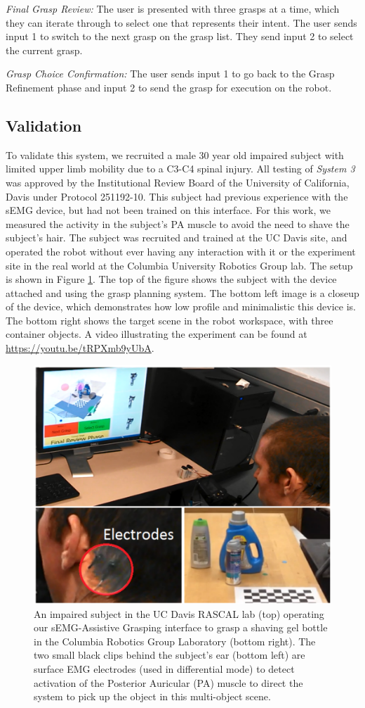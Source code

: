 \emph{Final Grasp Review:} The user is presented with three grasps at a time, which they can iterate through to select one that represents their intent. The user sends input 1 to switch to the next grasp on the grasp list. They send input 2 to select the current grasp. 

\emph{Grasp Choice Confirmation:} The user sends input 1 to go back to the Grasp Refinement phase and input 2 to send the grasp for execution on the robot.


\subsection{Validation}
To validate this system, we recruited a male 30 year old impaired subject with limited upper limb mobility due to a C3-C4 spinal injury. All testing of \emph{System 3} was approved by the Institutional Review Board of the University of California, Davis under Protocol 251192-10. This subject had previous experience with the sEMG device, but had not been trained on this interface. For this work, we measured the activity in the subject's PA muscle to avoid the need to shave the subject's hair. The subject was recruited and trained at the UC Davis site, and operated the robot without ever having any interaction with it or the experiment site in the real world at the Columbia University Robotics Group lab. The setup is shown in Figure \ref{fig:user-semg}. The top of the figure shows the subject with the device attached and using the grasp planning system. The bottom left image is a closeup of the device, which demonstrates how low profile and minimalistic this device is. The bottom right shows the target scene in the robot workspace, with three container objects. A video illustrating the experiment can be found at \url{https://youtu.be/tRPXmb9yUbA}.
\begin{figure}
\centering
\includegraphics[width=.8\columnwidth]{user_semg.png}
\caption{An impaired subject in the UC Davis RASCAL
lab (top) operating our sEMG-Assistive Grasping interface
to grasp a shaving gel bottle in the Columbia Robotics
Group Laboratory (bottom right). The two small black clips
behind the subject’s ear (bottom left) are surface EMG
electrodes (used in differential mode) to detect activation of
the Posterior Auricular (PA) muscle to direct the system to
pick up the object in this multi-object scene.}
\label{fig:user-semg}
\end{figure}


